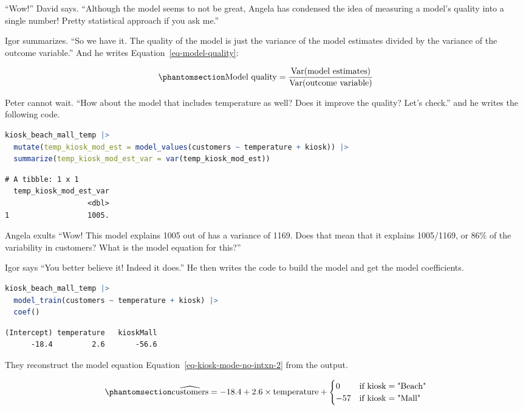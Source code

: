 \documentclass[
  12pt,
  letterpaper,
  DIV=11,
  numbers=noendperiod]{scrreprt}
\begin{document}
``Wow!'' David says. ``Although the model seems to not be great, Angela
has condensed the idea of measuring a model's quality into a single
number! Pretty statistical approach if you ask me.''

Igor summarizes. ``So we have it. The quality of the model is just the
variance of the model estimates divided by the variance of the outcome
variable.'' And he writes Equation~\ref{eq-model-quality}:

\begin{equation}\phantomsection\label{eq-model-quality}{
\text{Model quality}
=
\frac{\text{Var}(\text{model estimates})}
     {\text{Var}(\text{outcome variable})}
}\end{equation}

Peter cannot wait. ``How about the model that includes temperature as
well? Does it improve the quality? Let's check.'' and he writes the
following code.

\begin{lstlisting}[language=R]
kiosk_beach_mall_temp |> 
  mutate(temp_kiosk_mod_est = model_values(customers ~ temperature + kiosk)) |>
  summarize(temp_kiosk_mod_est_var = var(temp_kiosk_mod_est))
\end{lstlisting}

\begin{lstlisting}
# A tibble: 1 x 1
  temp_kiosk_mod_est_var
                   <dbl>
1                  1005.
\end{lstlisting}

Angela exults ``Wow! This model explains 1005 out of has a variance of
1169. Does that mean that it explains 1005/1169, or 86\% of the
variability in customers? What is the model equation for this?''

Igor says ``You better believe it! Indeed it does.'' He then writes the
code to build the model and get the model coefficients.

\begin{lstlisting}[language=R]
kiosk_beach_mall_temp |> 
  model_train(customers ~ temperature + kiosk) |> 
  coef()
\end{lstlisting}

\begin{lstlisting}
(Intercept) temperature   kioskMall 
      -18.4         2.6       -56.6 
\end{lstlisting}

They reconstruct the model equation
Equation~\ref{eq-kiosk-mode-no-intxn-2} from the output.

\begin{equation}\phantomsection\label{eq-kiosk-mode-no-intxn-2}{
\widehat{\text{customers}} = -18.4 + 2.6\times \text{temperature} +
\begin{cases}
0 & \text{if } \text{kiosk} = \text{"Beach"} \\
-57 &\text{if } \text{kiosk} = \text{"Mall"}
\end{cases}
}\end{equation}
\end{document}
